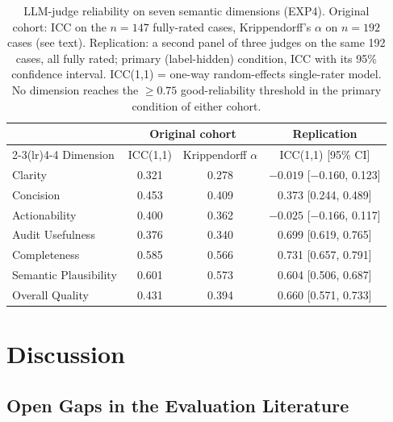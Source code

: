 \documentclass[10pt,a4paper,twoside]{article}
\begin{document}
\begin{table}[t]
\centering
\caption{LLM-judge reliability on seven semantic dimensions (EXP4). Original
cohort: ICC on the $n=147$ fully-rated cases, Krippendorff's $\alpha$ on
$n=192$ cases (see text). Replication: a second panel of three judges on the
same 192 cases, all fully rated; primary (label-hidden) condition, ICC with
its 95\% confidence interval. ICC(1,1) = one-way random-effects single-rater
model. No dimension reaches the $\geq 0.75$ good-reliability threshold
\citep{koo2016guideline} in the primary condition of either cohort.}
\label{tab:exp4_icc}
\small
\begin{tabular}{lccc}
\toprule
                       & \multicolumn{2}{c}{Original cohort} & Replication \\
\cmidrule(lr){2-3}\cmidrule(lr){4-4}
Dimension              & ICC(1,1) & Krippendorff $\alpha$ & ICC(1,1) [95\% CI] \\
\midrule
Clarity                & 0.321    & 0.278 & $-0.019$ [$-0.160$, 0.123] \\
Concision              & 0.453    & 0.409 & 0.373 [0.244, 0.489] \\
Actionability          & 0.400    & 0.362 & $-0.025$ [$-0.166$, 0.117] \\
Audit Usefulness       & 0.376    & 0.340 & 0.699 [0.619, 0.765] \\
Completeness           & 0.585    & 0.566 & 0.731 [0.657, 0.791] \\
Semantic Plausibility  & 0.601    & 0.573 & 0.604 [0.506, 0.687] \\
Overall Quality        & 0.431    & 0.394 & 0.660 [0.571, 0.733] \\
\bottomrule
\end{tabular}
\end{table}


\section{Discussion}
\label{sec:discussion}


\subsection{Open Gaps in the Evaluation Literature}
\label{sec:synthesis}
\end{document}

